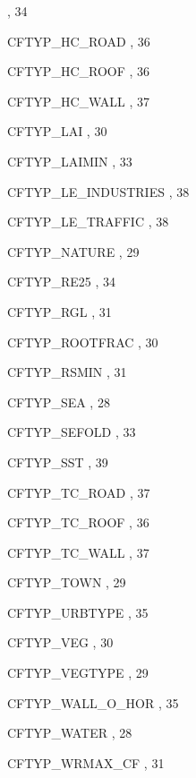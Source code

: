 \begin{theindex}
    \subitem {},  34
  \item CFTYP\_HC\_ROAD
    \subitem {},  36
  \item CFTYP\_HC\_ROOF
    \subitem {},  36
  \item CFTYP\_HC\_WALL
    \subitem {},  37
  \item CFTYP\_LAI
    \subitem {},  30
  \item CFTYP\_LAIMIN
    \subitem {},  33
  \item CFTYP\_LE\_INDUSTRIES
    \subitem {},  38
  \item CFTYP\_LE\_TRAFFIC
    \subitem {},  38
  \item CFTYP\_NATURE
    \subitem {},  29
  \item CFTYP\_RE25
    \subitem {},  34
  \item CFTYP\_RGL
    \subitem {},  31
  \item CFTYP\_ROOTFRAC
    \subitem {},  30
  \item CFTYP\_RSMIN
    \subitem {},  31
  \item CFTYP\_SEA
    \subitem {},  28
  \item CFTYP\_SEFOLD
    \subitem {},  33
  \item CFTYP\_SST
    \subitem {},  39
  \item CFTYP\_TC\_ROAD
    \subitem {},  37
  \item CFTYP\_TC\_ROOF
    \subitem {},  36
  \item CFTYP\_TC\_WALL
    \subitem {},  37
  \item CFTYP\_TOWN
    \subitem {},  29
  \item CFTYP\_URBTYPE
    \subitem {},  35
  \item CFTYP\_VEG
    \subitem {},  30
  \item CFTYP\_VEGTYPE
    \subitem {},  29
  \item CFTYP\_WALL\_O\_HOR
    \subitem {},  35
  \item CFTYP\_WATER
    \subitem {},  28
  \item CFTYP\_WRMAX\_CF
    \subitem {},  31

\end{theindex}
